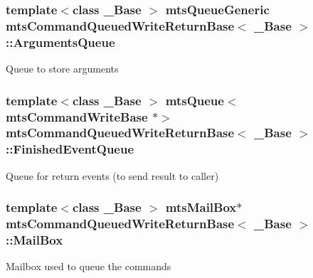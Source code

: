 \subsubsection[{Arguments\+Queue}]{\setlength{\rightskip}{0pt plus 5cm}template$<$class \+\_\+\+Base $>$ {\bf mts\+Queue\+Generic} {\bf mts\+Command\+Queued\+Write\+Return\+Base}$<$ \+\_\+\+Base $>$\+::Arguments\+Queue\hspace{0.3cm}{\ttfamily [protected]}}\label{classmts_command_queued_write_return_base_ac846c793220de2f8b31357230428434f}
Queue to store arguments \hypertarget{classmts_command_queued_write_return_base_aea7fcf280a846a7d73fb7ba81499e858}{}
\subsubsection[{Finished\+Event\+Queue}]{\setlength{\rightskip}{0pt plus 5cm}template$<$class \+\_\+\+Base $>$ {\bf mts\+Queue}$<${\bf mts\+Command\+Write\+Base} $\ast$$>$ {\bf mts\+Command\+Queued\+Write\+Return\+Base}$<$ \+\_\+\+Base $>$\+::Finished\+Event\+Queue\hspace{0.3cm}{\ttfamily [protected]}}\label{classmts_command_queued_write_return_base_aea7fcf280a846a7d73fb7ba81499e858}
Queue for return events (to send result to caller) \hypertarget{classmts_command_queued_write_return_base_ab619fecbd720f4b87db6169d1f210e16}{}
\subsubsection[{Mail\+Box}]{\setlength{\rightskip}{0pt plus 5cm}template$<$class \+\_\+\+Base $>$ {\bf mts\+Mail\+Box}$\ast$ {\bf mts\+Command\+Queued\+Write\+Return\+Base}$<$ \+\_\+\+Base $>$\+::Mail\+Box\hspace{0.3cm}{\ttfamily [protected]}}\label{classmts_command_queued_write_return_base_ab619fecbd720f4b87db6169d1f210e16}
Mailbox used to queue the commands \hypertarget{classmts_command_queued_write_return_base_a24118cfab2f7edbc060a3513787900c7}{}
